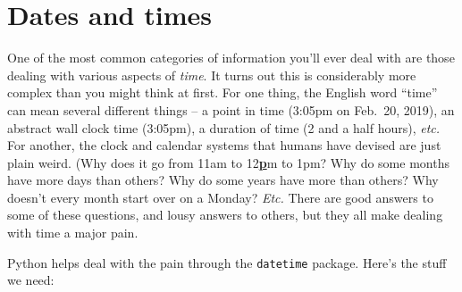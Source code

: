 
\chapter{Dates and times}

One of the most common categories of information you'll ever deal with are
those dealing with various aspects of \textit{time}. It turns out this is
considerably more complex than you might think at first. For one thing, the
English word ``time'' can mean several different things -- a point in time
(3:05pm on Feb.~20, 2019), an abstract wall clock time (3:05pm), a duration of
time (2 and a half hours), \textit{etc.} For another, the clock and calendar
systems that humans have devised are just plain weird. (Why does it go from
11am to 12\underline{\textbf{p}}m to 1pm? Why do some months have more days
than others? Why do some years have more than others? Why doesn't every month
start over on a Monday? \textit{Etc.} There are good answers to some of these
questions, and lousy answers to others, but they all make dealing with time a
major pain.

Python helps deal with the pain through the \texttt{datetime} package. Here's
the stuff we need:

